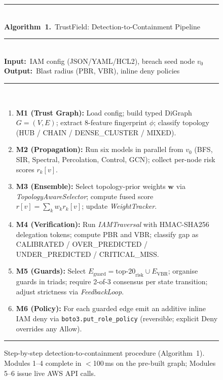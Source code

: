 \documentclass[conference,a4paper]{IEEEtran}
\begin{document}
\begin{figure}[t]
\small
\noindent\rule{\columnwidth}{0.4pt}\\[2pt]
\textbf{Algorithm~1.}\ TrustField: Detection-to-Containment Pipeline\\[2pt]
\rule{\columnwidth}{0.4pt}\\[3pt]
\textbf{Input:}\ IAM config (JSON/YAML/HCL2), breach seed node $v_0$\\
\textbf{Output:}\ Blast radius (PBR, VBR), inline deny policies\\[3pt]
\rule{\columnwidth}{0.4pt}\\[3pt]
\begin{enumerate}[label=\textbf{\arabic*.},leftmargin=1.8em,itemsep=2pt,parsep=0pt,topsep=3pt]
  \item \textbf{M1 (Trust Graph):} Load config; build typed DiGraph
        $G=(V,E)$; extract 8-feature fingerprint $\phi$; classify
        topology (HUB / CHAIN / DENSE\_CLUSTER / MIXED).
  \item \textbf{M2 (Propagation):} Run six models in parallel from
        $v_0$ (BFS, SIR, Spectral, Percolation, Control, GCN);
        collect per-node risk scores $r_k[v]$.
  \item \textbf{M3 (Ensemble):} Select topology-prior weights $\mathbf{w}$
        via \textit{TopologyAwareSelector}; compute fused score
        $r[v]=\sum_k w_k r_k[v]$; update \textit{WeightTracker}.
  \item \textbf{M4 (Verification):} Run \textit{IAMTraversal} with
        HMAC-SHA256 delegation tokens; compute PBR and VBR;
        classify gap as CALIBRATED / OVER\_PREDICTED /
        UNDER\_PREDICTED / CRITICAL\_MISS.
  \item \textbf{M5 (Guards):} Select
        $E_{\text{guard}}=\text{top-20}_{\text{risk}}\cup E_{\text{VBR}}$;
        organise guards in triads; require 2-of-3 consensus per
        state transition; adjust strictness via \textit{FeedbackLoop}.
  \item \textbf{M6 (Policy):} For each guarded edge emit an additive
        inline IAM deny via \texttt{boto3.put\_role\_policy}
        (reversible; explicit Deny overrides any Allow).
\end{enumerate}
\vspace{3pt}
\noindent\rule{\columnwidth}{0.4pt}
\caption{Step-by-step detection-to-containment procedure (Algorithm~1).
Modules 1--4 complete in $<$100\,ms on the pre-built graph; Modules
5--6 issue live AWS API calls.}
\label{fig:alg}
\end{figure}
\end{document}
